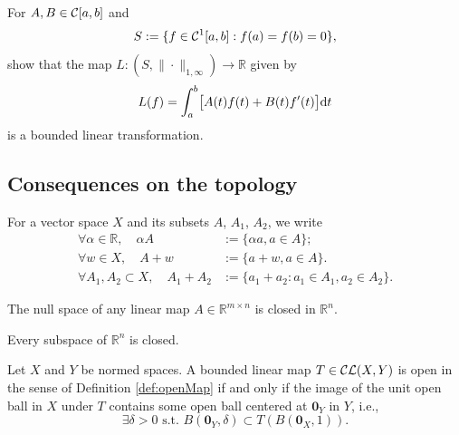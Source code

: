 \begin{exc}
  For $A,B\in {\cal C}[a,b]$ and
  \begin{equation}
    \label{eq:C10}
    S := \{f\in {\cal C}^1[a,b]: f(a)=f(b)=0\}, 
  \end{equation}
  show that the map 
  $L: (S, \|\cdot\|_{1,\infty}) \rightarrow \mathbb{R}$
  given by
  \begin{displaymath}
    L(f) = \int_a^b \bigl[A(t)f(t)+B(t)f'(t)\bigr] \mathrm{d} t
  \end{displaymath}
  is a bounded linear transformation.
\end{exc}

\subsection{Consequences on the topology}

\begin{ntn}
  \label{ntn:setLinearOpNotation}
  For a vector space $X$ and 
  its subsets $A$, $A_1$, $A_2$, 
  we write
    \begin{displaymath}
      \begin{array}{rl}
        \forall \alpha\in \mathbb{R},
        \quad \alpha A &:= \{\alpha a, a\in A\};
        \\
        \forall w\in X,\quad 
        A + w &:= \{a+w, a\in A\}.
        \\
        \forall A_1, A_2 \subset X,\quad 
        A_1 + A_2 &:= \{a_1+a_2: a_1\in A_1, a_2\in A_2\}.
      \end{array}
  \end{displaymath}
\end{ntn}

\begin{lem}
  \label{lem:KernelIsClosed}
  The null space of any linear map $A\in \mathbb{R}^{m\times n}$
  is closed in $\mathbb{R}^n$.
\end{lem}

\begin{thm}
  \label{thm:finiteDimSubspaceIsClosed}
  Every subspace of $\mathbb{R}^n$ is closed.
\end{thm}

\begin{lem}
  \label{lem:openMapCharInNormedSpaces}
  Let $X$ and $Y$ be normed spaces.
  A bounded linear map $T\in {\cal CL}(X,Y)$ is open
  in the sense of Definition \ref{def:openMap}
  if and only if the image of the unit open ball in $X$ under $T$
  contains some open ball centered at $\mathbf{0}_Y$ in $Y$, i.e.,
  \begin{equation}
    \label{eq:openMapCharInNormedSpaces}
    \exists \delta>0 \text{ s.t. }
    B(\mathbf{0}_Y, \delta) \subset T\left({B(\mathbf{0}_X,1)}\right).
  \end{equation}
\end{lem}

